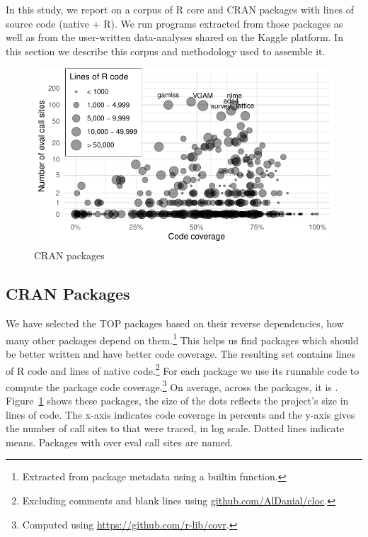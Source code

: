 \documentclass[conference]{IEEEtran}
\begin{document}
In this study, we report on a corpus of \CorpusCorePackages R core and
\CorpusPackages CRAN packages with \CorpusAllCodeRnd lines of source code
(native + R).  We run \CorpusAllProgramsRnd programs extracted from those
packages as well as from the user-written data-analyses shared on the Kaggle
platform. In this section we describe this corpus and methodology used to
assemble it.

\begin{figure}[!h]\centering\includegraphics[width=\linewidth]
  {corpus.pdf}\caption{CRAN packages}\label{fig:corpus}
\end{figure}

\subsection{CRAN Packages}

We have selected the TOP \CorpusPackages packages based on their reverse
dependencies, \ie how many other packages depend on them.\footnote{Extracted
  from package metadata using a builtin function.}  This helps us find
packages which should be better written and have better code coverage.  The
resulting set contains \CorpusRCodeRnd lines of R code and
\CorpusNativeCodeRnd lines of native code.\footnote{Excluding comments and
  blank lines using \url{github.com/AlDanial/cloc}.}  For each package we
use its runnable code to compute the package code coverage.\footnote{Computed
  using \url{ https://github.com/r-lib/covr}.} On average, across the
\CorpusPackages packages, it is \CorpusMeanExprCoverage.
Figure~\ref{fig:corpus} shows these packages, the size of the dots reflects
the project's size in lines of code.  The x-axis indicates code coverage in
percents and the y-axis gives the number of call sites to \eval that were traced, in log
scale. Dotted lines indicate means. Packages with over
\CorpusEvalsPackageTreshold eval call sites are named.
\end{document}
